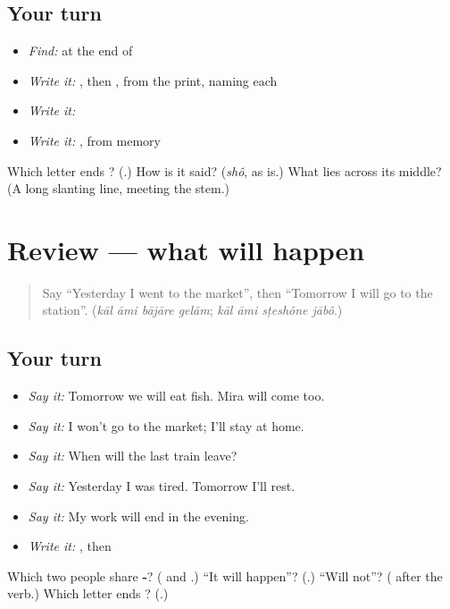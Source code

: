 \subsection*{Your turn}
\begin{itemize}
\raggedright
  \item \emph{Find:}  at the end of \textbf{}
  \item \emph{Write it:} , then , from the print, naming each
  \item \emph{Write it:} \textbf{}
  \item \emph{Write it:} , from memory
\end{itemize}

\begin{tcolorbox}[breakable,colback=teal!4,colframe=teal!35!black,title={Before you move on}]
Which letter ends \textbf{}? (\textbf{}.) How is it said? (\emph{shô}, as \textbf{} is.) What lies across its middle? (A long slanting line, meeting the stem.)
\end{tcolorbox}
\section[(review)]{Review — what will happen}

\label{lesson:BN-R265-what-will-happen}



\begin{quote}
Say \textquotedblleft{}Yesterday I went to the market\textquotedblright{}, then \textquotedblleft{}Tomorrow I will go to the station\textquotedblright{}. (\emph{kāl āmi bājāre gelām}; \emph{kāl āmi sṭeshône jābô}.)
\end{quote}

\subsection*{Your turn}
\begin{itemize}
\raggedright
  \item \emph{Say it:} Tomorrow we will eat fish. Mira will come too.
  \item \emph{Say it:} I won't go to the market; I'll stay at home.
  \item \emph{Say it:} When will the last train leave?
  \item \emph{Say it:} Yesterday I was tired. Tomorrow I'll rest.
  \item \emph{Say it:} My work will end in the evening.
  \item \emph{Write it:} \textbf{}, then 
\end{itemize}

\begin{tcolorbox}[breakable,colback=teal!4,colframe=teal!35!black,title={Before you move on}]
Which two people share \textbf{-}? (\textbf{} and \textbf{}.) \textquotedblleft{}It will happen\textquotedblright{}? (\textbf{}.) \textquotedblleft{}Will not\textquotedblright{}? (\textbf{} after the verb.) Which letter ends \textbf{}? (\textbf{}.)
\end{tcolorbox}
